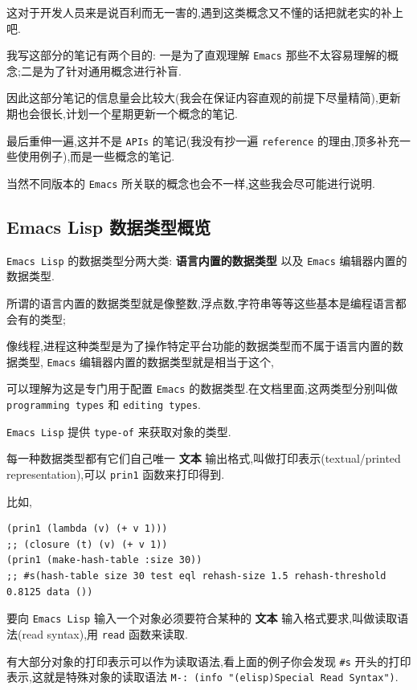 \documentclass[11pt]{article}
\begin{document}
这对于开发人员来是说百利而无一害的,遇到这类概念又不懂的话把就老实的补上吧.

我写这部分的笔记有两个目的: 一是为了直观理解 \texttt{Emacs} 那些不太容易理解的概念;二是为了针对通用概念进行补盲.

因此这部分笔记的信息量会比较大(我会在保证内容直观的前提下尽量精简),更新期也会很长,计划一个星期更新一个概念的笔记.

最后重伸一遍,这并不是 \texttt{APIs} 的笔记(我没有抄一遍 \texttt{reference} 的理由,顶多补充一些使用例子),而是一些概念的笔记.

当然不同版本的 \texttt{Emacs} 所关联的概念也会不一样,这些我会尽可能进行说明.

\subsection{Emacs Lisp 数据类型概览}
\label{sec:org0c26040}

\texttt{Emacs Lisp} 的数据类型分两大类: \textbf{语言内置的数据类型} 以及 \texttt{Emacs} 编辑器内置的数据类型.

所谓的语言内置的数据类型就是像整数,浮点数,字符串等等这些基本是编程语言都会有的类型;

像线程,进程这种类型是为了操作特定平台功能的数据类型而不属于语言内置的数据类型, \texttt{Emacs} 编辑器内置的数据类型就是相当于这个,

可以理解为这是专门用于配置 \texttt{Emacs} 的数据类型.在文档里面,这两类型分别叫做 \texttt{programming types} 和 \texttt{editing types}.

\texttt{Emacs Lisp} 提供 \texttt{type-of} 来获取对象的类型.


每一种数据类型都有它们自己唯一 \textbf{文本} 输出格式,叫做打印表示(textual/printed representation),可以 \texttt{prin1} 函数来打印得到.

比如,

\begin{verbatim}
(prin1 (lambda (v) (+ v 1)))
;; (closure (t) (v) (+ v 1))
(prin1 (make-hash-table :size 30))
;; #s(hash-table size 30 test eql rehash-size 1.5 rehash-threshold 0.8125 data ())
\end{verbatim}

要向 \texttt{Emacs Lisp} 输入一个对象必须要符合某种的 \textbf{文本} 输入格式要求,叫做读取语法(read syntax),用 \texttt{read} 函数来读取.

有大部分对象的打印表示可以作为读取语法,看上面的例子你会发现 \texttt{\#s} 开头的打印表示,这就是特殊对象的读取语法 \texttt{M-: (info "(elisp)Special Read Syntax")}.
\end{document}
